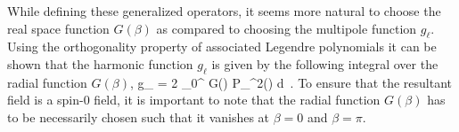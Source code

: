 While defining these generalized operators, it seems more natural to choose the real space function $G(\beta)$ as compared to choosing the multipole function $g_{\ell}$. Using the orthogonality property of associated Legendre polynomials it can be shown that the harmonic function $g_{\ell}$ is given by the following integral over the radial function $G(\beta)$,
%
\beq
g_{\ell} = 2 \pi {} \int _{0}^{\pi} G(\beta) P_{\ell}^{2}(\cos{\beta}) d\cos{\beta} \,. \label{eq:gb2bl}
\eeq
%
To ensure that the resultant field is a spin-0 field, it is important to note that the radial function $G(\beta)$ has to be necessarily chosen such that it vanishes at $\beta=0$ and $\beta=\pi$. 

